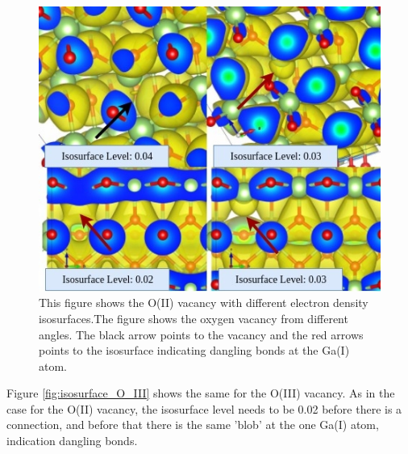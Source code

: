\begin{figure}[H]
\includegraphics[width=\linewidth]{../fig/isosurfaces/O_II/isosurface}\caption{This figure shows the O(II) vacancy with different electron density isosurfaces.The figure shows the oxygen vacancy from different angles. The black arrow points to the vacancy and the red arrows points to the isosurface indicating dangling bonds at the Ga(I) atom.}\label{fig:isosurface_O_II}
\end{figure}

Figure \ref{fig:isosurface_O_III} shows the same for the O(III) vacancy. As in the case for the O(II) vacancy, the isosurface level needs to be 0.02 before there is a connection, and before that there is the same 'blob' at the one Ga(I) atom, indication dangling bonds.

